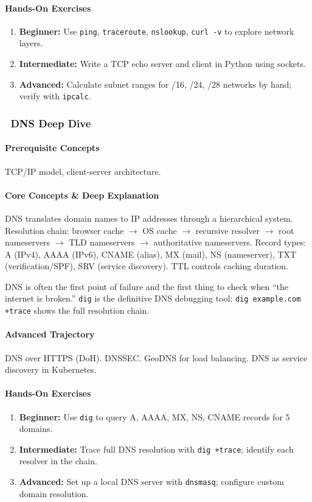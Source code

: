 \documentclass[11pt, a4paper, oneside]{report}
\newcommand{\mustmaster}[1]{\subsubsection{\texorpdfstring{\fcolorbox{blue!40!black}{blue!8}{\footnotesize\bfseries\color{blue!40!black} MUST MASTER}~#1}{#1}}}
\newcommand{\arrow}{$\rightarrow$}
\begin{document}
\paragraph{Hands-On Exercises}
\begin{enumerate}[leftmargin=*]
\item \textbf{Beginner:} Use \texttt{ping}, \texttt{traceroute}, \texttt{nslookup}, \texttt{curl -v} to explore network layers.
\item \textbf{Intermediate:} Write a TCP echo server and client in Python using sockets.
\item \textbf{Advanced:} Calculate subnet ranges for /16, /24, /28 networks by hand; verify with \texttt{ipcalc}.
\end{enumerate}

\mustmaster{DNS Deep Dive}

\paragraph{Prerequisite Concepts} TCP/IP model, client-server architecture.

\paragraph{Core Concepts \& Deep Explanation} DNS translates domain names to IP addresses through a hierarchical system. Resolution chain: browser cache \arrow{} OS cache \arrow{} recursive resolver \arrow{} root nameservers \arrow{} TLD nameservers \arrow{} authoritative nameservers. Record types: A (IPv4), AAAA (IPv6), CNAME (alias), MX (mail), NS (nameserver), TXT (verification/SPF), SRV (service discovery). TTL controls caching duration.

DNS is often the first point of failure and the first thing to check when ``the internet is broken.'' \texttt{dig} is the definitive DNS debugging tool: \texttt{dig example.com +trace} shows the full resolution chain.

\paragraph{Advanced Trajectory} DNS over HTTPS (DoH). DNSSEC. GeoDNS for load balancing. DNS as service discovery in Kubernetes.

\paragraph{Hands-On Exercises}
\begin{enumerate}[leftmargin=*]
\item \textbf{Beginner:} Use \texttt{dig} to query A, AAAA, MX, NS, CNAME records for 5 domains.
\item \textbf{Intermediate:} Trace full DNS resolution with \texttt{dig +trace}; identify each resolver in the chain.
\item \textbf{Advanced:} Set up a local DNS server with \texttt{dnsmasq}; configure custom domain resolution.
\end{enumerate}
\end{document}
